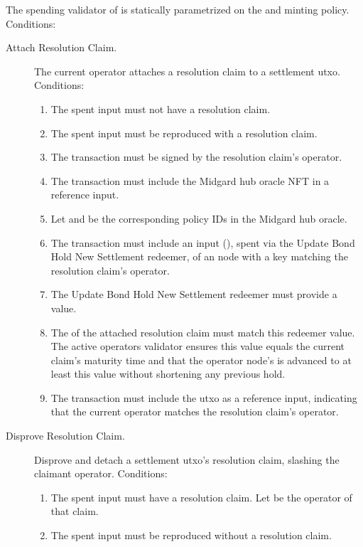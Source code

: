 \documentclass[../midgard.tex]{subfiles}
\begin{document}
The spending validator of  is statically parametrized on the  and  minting policy.
Conditions:
\begin{description}
  \item[Attach Resolution Claim.] The current operator attaches a resolution claim to a settlement utxo.
    Conditions:
      \begin{enumerate}
        \item The spent input must not have a resolution claim.
        \item The spent input must be reproduced with a resolution claim.
        \item The transaction must be signed by the resolution claim's operator.
        \item The transaction must include the Midgard hub oracle NFT in a reference input.
        \item Let  and  be the corresponding policy IDs in the Midgard hub oracle.
        \item The transaction must include an input (), spent via the Update Bond Hold New Settlement redeemer, of an  node with a key matching the resolution claim's operator.
        \item The Update Bond Hold New Settlement redeemer must provide a  value.
        \item The  of the attached resolution claim must match this redeemer value.
          The active operators validator ensures this value equals the current claim's maturity time and that the operator node's  is advanced to at least this value without shortening any previous hold.
        \item The transaction must include the  utxo as a reference input, indicating that the current operator matches the resolution claim's operator.
      \end{enumerate}
  \item[Disprove Resolution Claim.] Disprove and detach a settlement utxo's resolution claim, slashing the claimant operator.
    Conditions:
      \begin{enumerate}
        \item The spent input must have a resolution claim.
          Let  be the operator of that claim.
        \item The spent input must be reproduced without a resolution claim.

\end{enumerate}
\end{description}
\end{document}
